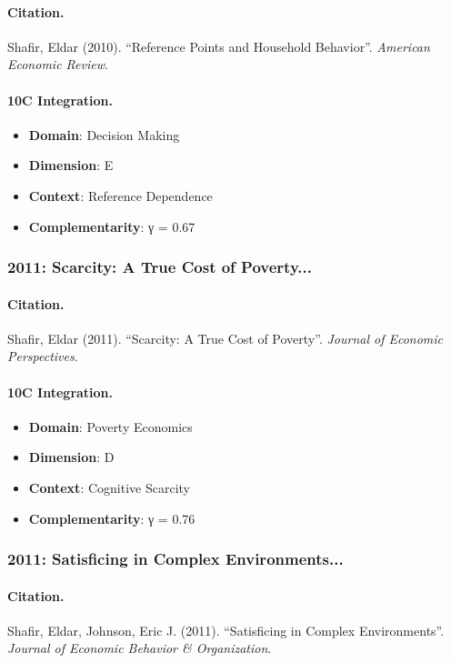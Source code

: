 \paragraph{Citation.}
Shafir, Eldar (2010). ``Reference Points and Household Behavior''. \textit{American Economic Review}.

\paragraph{10C Integration.}
\begin{itemize}[nosep]
  \item \textbf{Domain}: Decision Making
  \item \textbf{Dimension}: E
  \item \textbf{Context}: Reference Dependence
  \item \textbf{Complementarity}: γ = 0.67
\end{itemize}


\subsubsection{2011: Scarcity: A True Cost of Poverty...}

\paragraph{Citation.}
Shafir, Eldar (2011). ``Scarcity: A True Cost of Poverty''. \textit{Journal of Economic Perspectives}.

\paragraph{10C Integration.}
\begin{itemize}[nosep]
  \item \textbf{Domain}: Poverty Economics
  \item \textbf{Dimension}: D
  \item \textbf{Context}: Cognitive Scarcity
  \item \textbf{Complementarity}: γ = 0.76
\end{itemize}


\subsubsection{2011: Satisficing in Complex Environments...}

\paragraph{Citation.}
Shafir, Eldar, Johnson, Eric J. (2011). ``Satisficing in Complex Environments''. \textit{Journal of Economic Behavior & Organization}.

